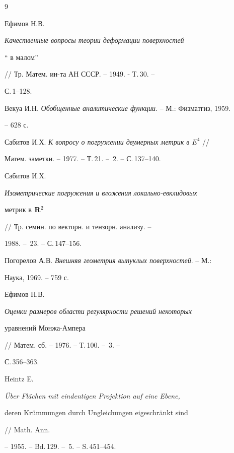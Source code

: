\begin{thebibliography}{9} 


 




Ефимов Н.В. {\em Качественные вопросы теории деформации поверхностей 


`` в малом''} // Тр. Матем. ин-та АН СССР. -- 1949. - Т.\,30. -- 


С.\,1--128. 




Векуа И.Н. {\em Обобщенные аналитические функции}. -- М.: Физматгиз, 1959. 


-- 628 с. 




Сабитов И.Х. {\em К вопросу о погружении двумерных метрик в $E^4$} // 


Матем. заметки. -- 1977. -- Т.\,21. -- \No\,2. -- С.\,137--140. 




Сабитов И.Х. {\em Изометрические погружения и вложения локально-евклидовых 


метрик в $\bold R^2$} // Тр. семин. по векторн. и тензорн. анализу. --


1988. -- \No\,23. -- С.\,147--156. 




Погорелов А.В. {\em Внешняя геометрия выпуклых поверхностей}. -- М.: 


Наука, 1969. -- 759 с. 




Ефимов Н.В. {\em Оценки размеров области регулярности решений некоторых 


уравнений Монжа-Ампера} // Матем. сб. -- 1976. -- Т.\,100. -- \No\,3. -- 


С.\,356--363. 




Heintz E. {\em \"Uber Fl\"achen mit eindentigen Projektion auf eine Ebene, 


deren Kr\"ummungen durch Ungleichungen eigeschr\"ankt sind} // Math. Ann. 


-- 1955. -- Bd.\,129. -- \No\,5. -- S.\,451--454. 


 


 


\end{thebibliography} 


 


\vskip 2cm 


 






 


 


